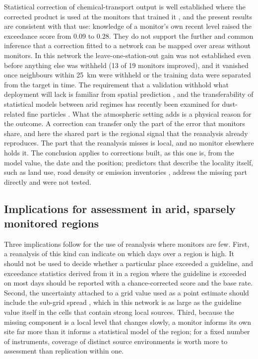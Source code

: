 Statistical correction of chemical-transport output is well established where the corrected
product is used at the monitors that trained it \citep{djalalova2015,huang2017}, and the present
results are consistent with that use: knowledge of a monitor's own recent level raised the
exceedance score from 0.09 to 0.28. They do not support the further and common inference that a
correction fitted to a network can be mapped over areas without monitors. In this network the
leave-one-station-out gain was not established even before anything else was withheld (13 of 19
monitors improved), and it vanished once neighbours within 25~km were withheld or the training data
were separated from the target in time.
The requirement that a validation withhold what deployment will lack is familiar from
spatial prediction \citep{roberts2017,ploton2020,wadoux2021}, and the transferability of
statistical models between arid regimes has recently been examined for dust-related fine
particles \citep{hurynovich2026}. What the atmospheric setting adds is a physical reason for the
outcome. A correction can transfer only the part of the error that monitors share, and here the
shared part is the regional signal that the reanalysis already reproduces. The part that the
reanalysis misses is local, and no monitor elsewhere holds it. The conclusion applies to
corrections built, as this one is, from the model value, the date and the position; predictors
that describe the locality itself, such as land use, road density or emission inventories
\citep{zhang2018lur}, address the missing part directly and were not tested.

\subsection{Implications for assessment in arid, sparsely monitored regions}

Three implications follow for the use of reanalysis \pmten{} where monitors are few. First, a
reanalysis of this kind can indicate on which days \pmten{} over a region is high. It should not
be used to decide whether a particular place exceeded a guideline, and exceedance statistics
derived from it in a region where the guideline is exceeded on most days should be reported with
a chance-corrected score and the base rate. Second, the uncertainty attached to a grid value
used as a point estimate should include the sub-grid spread \citep{denby2011}, which in this network is as large
as the guideline value itself in the cells that contain strong local sources. Third, because the
missing component is a local level that changes slowly, a monitor informs its own site far more
than it informs a statistical model of the region; for a fixed number of instruments, coverage
of distinct source environments is worth more to assessment than replication within one.

